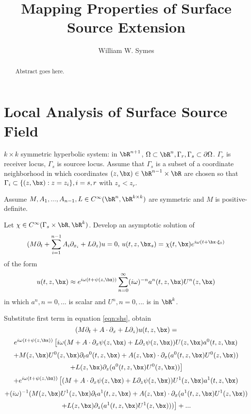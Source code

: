 \title{Mapping Properties of Surface Source Extension}
\author{William W. Symes}

\begin{abstract}
  Abstract goes here.
\end{abstract}

\section{Local Analysis of Surface Source Field}
$k \times  k$ symmetric hyperbolic system: in $\bR^{n+1}$, $\Omega
\subset \bR^n, \Gamma_r, \Gamma_s \subset \partial \Omega$. $\Gamma_r$
is receiver locus, $\Gamma_s$ is sourcee locus. Assume that $\Gamma_s$
is a subset of a coordinate neighborhood in  which coordinates
$(z,\bx) \in \bR^{n-1} \times \bR$ are
chosen so that $\Gamma_i\subset \{(z,\bx): z=z_i\}, i=s,r$ with $z_s <
z_r$.

Assume $M, A_1,...,A_{n-1}, L \in C^{\infty}(\bR^n, \bR^{k\times k})$
are symmetric and $M$ is positive-definite.

Let $\chi \in C^{\infty}(\Gamma_s \times \bR, \bR^k)$.
Develop an asymptotic solution of
\begin{equation}
  \label{eqn:shs}
  (M\partial_t + \sum_{i=1}^{n-1}A_i \partial_{x_i} + L \partial_z)
  u = 0,\, u(t,z,\bx_s) = \chi(t,\bx)e^{i\omega(t + \bx \cdot \xi_0)}
\end{equation}
of the form
\begin{equation}
  \label{eqn:hfa}
  u(t,z,\bx) \approx e^{i\omega(t + \psi(z,\bx))} \sum_{n=0}^{\infty}
  (i\omega)^{-n}a^n(t,z,\bx) U^n(z,\bx)
\end{equation}
in which $a^n, n=0,...$ is scalar and $U^n, n=0,...$ is in $\bR^k$. 

Substitute first term in equation \ref{eqn:shs}, obtain
\[
(M\partial_t + A\cdot \partial_x + L \partial_z)u(t,z,\bx) =
\]
\[
 e^{i\omega(t + \psi(z,\bx))}\left[ i\omega (M + A
\cdot \partial_x \psi(z,\bx) + L \partial_z
\psi(z,\bx))U(z,\bx)a^0(t,z,\bx) \right.
\]
\[
+ M(z,\bx) U^0(z,\bx) \partial_t a^0(t,z,\bx) + A(z,\bx)\cdot \partial_x
(a^0(t,z,\bx) U^0(z,\bx))
\]
\[
 \left.   + L(z,\bx)\partial_z (a^0(t,z,\bx)U^0(z,\bx))\right]
\]
\[
+  e^{i\omega(t + \psi(z,\bx))}\left[ (M + A
\cdot \partial_x \psi(z,\bx) + L \partial_z
\psi(z,\bx))U^1(z,\bx)a^1(t,z,\bx) \right.
\]
\[
  + (i\omega)^{-1} (M(z,\bx) U^1(z,\bx) \partial_t a^1(t,z,\bx)
    + A(z,\bx)\cdot \partial_x  (a^1(t,z,\bx) U^1(z,\bx))
\]
\begin{equation}
  \label{eqn:series}
  \left.   + L(z,\bx)\partial_z (a^1(t,z,\bx)U^1(z,\bx)))\right]
+...
\end{equation}

